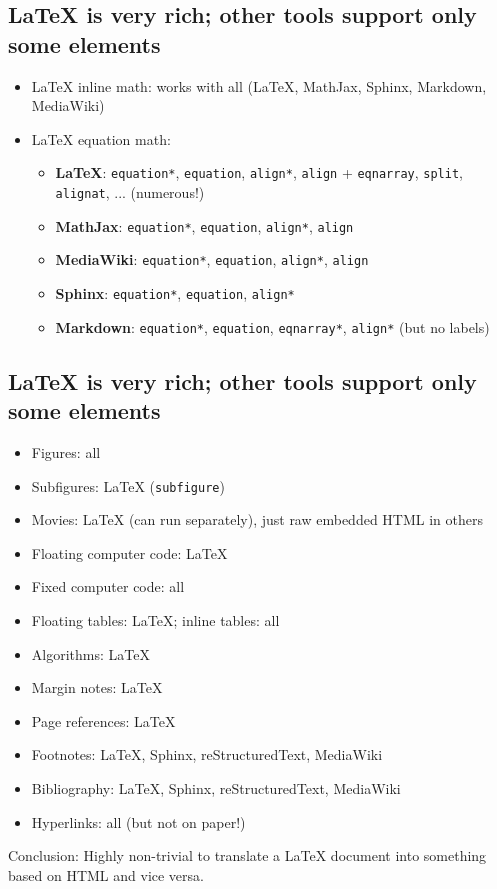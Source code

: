 \documentclass[%
oneside,                 %
final,                   %
10pt]{article}
\begin{document}
\subsection{{\LaTeX} is very rich; other tools support only some elements}
\begin{itemize}
 \item {\LaTeX} inline math: works with all ({\LaTeX}, MathJax, Sphinx, Markdown, MediaWiki)
 \item {\LaTeX} equation math:
\begin{itemize}
    \item \textbf{LaTeX}: \texttt{equation*}, \texttt{equation}, \texttt{align*}, \texttt{align} +
      \texttt{eqnarray}, \texttt{split}, \texttt{alignat}, ... (numerous!)
    \item \textbf{MathJax}: \texttt{equation*}, \texttt{equation}, \texttt{align*}, \texttt{align}
    \item \textbf{MediaWiki}: \texttt{equation*}, \texttt{equation}, \texttt{align*}, \texttt{align}
    \item \textbf{Sphinx}: \texttt{equation*}, \texttt{equation}, \texttt{align*}
    \item \textbf{Markdown}: \texttt{equation*}, \texttt{equation}, \texttt{eqnarray*}, \texttt{align*} (but no labels)
\end{itemize}
\noindent
\end{itemize}
\noindent
\subsection{{\LaTeX} is very rich; other tools support only some elements}
\begin{itemize}
 \item Figures: all
 \item Subfigures: {\LaTeX} (\texttt{subfigure})
 \item Movies: {\LaTeX} (can run separately), just raw embedded HTML in others
 \item Floating computer code: {\LaTeX}
 \item Fixed computer code: all
 \item Floating tables: {\LaTeX}; inline tables: all
 \item Algorithms: {\LaTeX}
 \item Margin notes: {\LaTeX}
 \item Page references: {\LaTeX}
 \item Footnotes: {\LaTeX}, Sphinx, reStructuredText, MediaWiki
 \item Bibliography: {\LaTeX}, Sphinx, reStructuredText, MediaWiki
 \item Hyperlinks: all (but not on paper!)
\end{itemize}
\noindent
Conclusion: Highly non-trivial to translate a {\LaTeX} document into something
based on HTML and vice versa.
\end{document}
